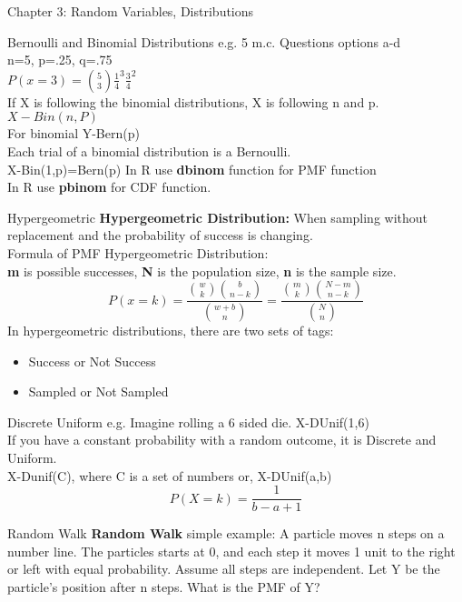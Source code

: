 \documentclass[a4paper, 12pt]{article}
\begin{document}
\begin{section}{Chapter 3: Random Variables, Distributions}
\begin{subsection}{Bernoulli and Binomial Distributions}
e.g. 5 m.c. Questions options a-d\\
\indent n=5, p=.25, q=.75\\
\indent $P(x=3)={5 \choose 3}\frac{1}{4}^{3}\frac{3}{4}^{2}$\\
If X is following the binomial distributions, X is following n and p. $X-Bin(n,P)$\\
For binomial Y-Bern(p)\\
Each trial of a binomial distribution is a Bernoulli.\\
X-Bin(1,p)=Bern(p)
In R use \textbf{dbinom} function for PMF function\\
In R use \textbf{pbinom} for CDF function.\\
\end{subsection}
\begin{subsection}{Hypergeometric}
\textbf{Hypergeometric Distribution:} When sampling without replacement and the probability of success is changing.\\
\indent Formula of PMF Hypergeometric Distribution:\\
\indent \textbf{m} is possible successes, \textbf{N} is the population size, \textbf{n} is the sample size.
\begin{equation} 
P(x=k)=\frac{{w \choose k}{b \choose n-k}}{{w+b \choose n}}=
\frac{{m \choose k}{N-m \choose n-k}}{{N \choose n}}
\end{equation}
In hypergeometric distributions, there are two sets of tags:\\
\begin{itemize}
\item{Success or Not Success}
\item{Sampled or Not Sampled}
\end{itemize}
\end{subsection}
\begin{subsection}{Discrete Uniform}
e.g. Imagine rolling a 6 sided die. X-DUnif(1,6)\\
If you have a constant probability with a random outcome, it is Discrete and Uniform.\\
X-Dunif(C), where C is a set of numbers or, X-DUnif(a,b)
\begin{equation} 
P(X=k)=\frac{1}{b-a+1}
\end{equation}
\end{subsection}
\begin{subsection}{Random Walk}
\textbf{Random Walk} simple example: A particle moves n steps on a number line. The particles starts at 0, and each step it moves 1 unit to the right or left with equal probability. Assume all steps are independent. Let Y be the particle's position after n steps. What is the PMF of Y?\\

\end{subsection}
\end{section}
\end{document}
